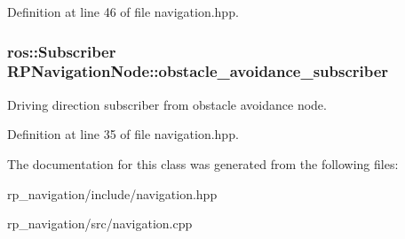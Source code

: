 \-Definition at line 46 of file navigation.\-hpp.

\hypertarget{class_r_p_navigation_node_ae03e8685753a6526a06b9c5eac41248d}{
\subsubsection[{obstacle\-\_\-avoidance\-\_\-subscriber}]{\setlength{\rightskip}{0pt plus 5cm}ros\-::\-Subscriber {\bf \-R\-P\-Navigation\-Node\-::obstacle\-\_\-avoidance\-\_\-subscriber}}}\label{class_r_p_navigation_node_ae03e8685753a6526a06b9c5eac41248d}
\-Driving direction subscriber from obstacle avoidance node. 

\-Definition at line 35 of file navigation.\-hpp.



\-The documentation for this class was generated from the following files\-:\begin{DoxyCompactItemize}
\item 
rp\-\_\-navigation/include/navigation.\-hpp\item 
rp\-\_\-navigation/src/navigation.\-cpp\end{DoxyCompactItemize}
